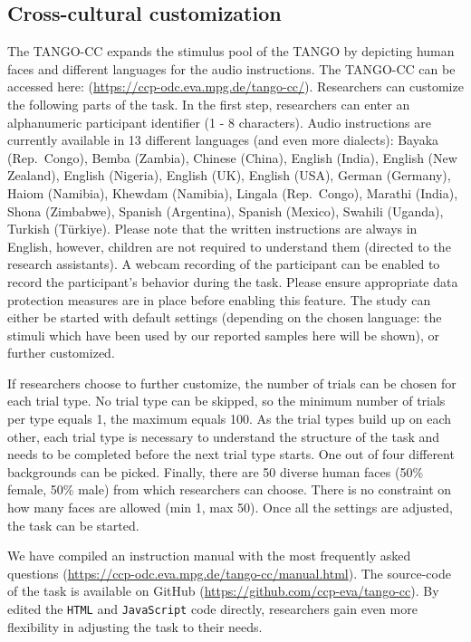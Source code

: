 \documentclass[
  man,mask,floatsintext]{apa7}
\begin{document}
\hypertarget{cross-cultural-customization}{%
\subsection{Cross-cultural customization}\label{cross-cultural-customization}}

The TANGO-CC expands the stimulus pool of the TANGO by depicting human faces and different languages for the audio instructions. The TANGO-CC can be accessed here: (\url{https://ccp-odc.eva.mpg.de/tango-cc/}). Researchers can customize the following parts of the task. In the first step, researchers can enter an alphanumeric participant identifier (1 - 8 characters). Audio instructions are currently available in 13 different languages (and even more dialects): Bayaka (Rep.~Congo), Bemba (Zambia), Chinese (China), English (India), English (New Zealand), English (Nigeria), English (UK), English (USA), German (Germany), Hai\textbar\textbar om (Namibia), Khewdam (Namibia), Lingala (Rep.~Congo), Marathi (India), Shona (Zimbabwe), Spanish (Argentina), Spanish (Mexico), Swahili (Uganda), Turkish (Türkiye). Please note that the written instructions are always in English, however, children are not required to understand them (directed to the research assistants). A webcam recording of the participant can be enabled to record the participant's behavior during the task. Please ensure appropriate data protection measures are in place before enabling this feature. The study can either be started with default settings (depending on the chosen language: the stimuli which have been used by our reported samples here will be shown), or further customized.

If researchers choose to further customize, the number of trials can be chosen for each trial type. No trial type can be skipped, so the minimum number of trials per type equals 1, the maximum equals 100. As the trial types build up on each other, each trial type is necessary to understand the structure of the task and needs to be completed before the next trial type starts. One out of four different backgrounds can be picked. Finally, there are 50 diverse human faces (50\% female, 50\% male) from which researchers can choose. There is no constraint on how many faces are allowed (min 1, max 50). Once all the settings are adjusted, the task can be started.

We have compiled an instruction manual with the most frequently asked questions (\url{https://ccp-odc.eva.mpg.de/tango-cc/manual.html}). The source-code of the task is available on GitHub (\url{https://github.com/ccp-eva/tango-cc}). By edited the \texttt{HTML} and \texttt{JavaScript} code directly, researchers gain even more flexibility in adjusting the task to their needs.
\end{document}
